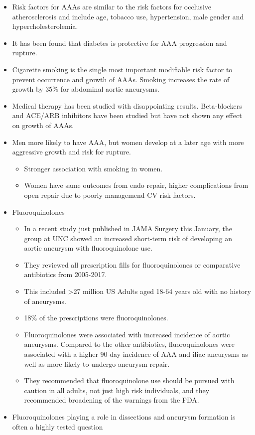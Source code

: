 \documentclass[
]{book}
\begin{document}
\begin{itemize}
\item
  Risk factors for AAAs are similar to the risk factors for occlusive
  atherosclerosis and include age, tobacco use, hypertension, male
  gender and hypercholesterolemia.
\item
  It has been found that diabetes is protective for AAA progression
  and rupture.
\item
  Cigarette smoking is the single most important modifiable risk
  factor to prevent occurrence and growth of AAAs. Smoking increases
  the rate of growth by 35\% for abdominal aortic aneurysms.
\item
  Medical therapy has been studied with disappointing results.
  Beta-blockers and ACE/ARB inhibitors have been studied but have not
  shown any effect on growth of AAAs.
\item
  Men more likely to have AAA, but women develop at a later age with
  more aggressive growth and risk for rupture.
  \citep{loAbdominalAorticAneurysms2016}

  \begin{itemize}
  \item
    Stronger association with smoking in women.
  \item
    Women have same outcomes from endo repair, higher complications
    from open repair due to poorly managemend CV risk factors.
  \end{itemize}
\item
  Fluoroquinolones\citep{lee2015, lee2018, lemaire2018, pasternak2018}

  \begin{itemize}
  \item
    In a recent study just published in JAMA Surgery this January,
    the group at UNC showed an increased short-term risk of
    developing an aortic aneurysm with fluoroquinolone use.
    \citep{newtonAssociationFluoroquinoloneUse2021a}
  \item
    They reviewed all prescription fills for fluoroquinolones or
    comparative antibiotics from 2005-2017.
  \item
    This included \textgreater27 million US Adults aged 18-64 years old with
    no history of aneurysms.
  \item
    18\% of the prescriptions were fluoroquinolones.
  \item
    Fluoroquinolones were associated with increased incidence of
    aortic aneurysms. Compared to the other antibiotics,
    fluoroquinolones were associated with a higher 90-day incidence
    of AAA and iliac aneurysms as well as more likely to undergo
    aneurysm repair.
  \item
    They recommended that fluoroquinolone use should be pursued with
    caution in all adults, not just high risk individuals, and they
    recommended broadening of the warnings from the FDA.
  \end{itemize}
\item
  Fluoroquinolones playing a role in dissections and aneurysm
  formation is often a highly tested question
\end{itemize}
\end{document}
